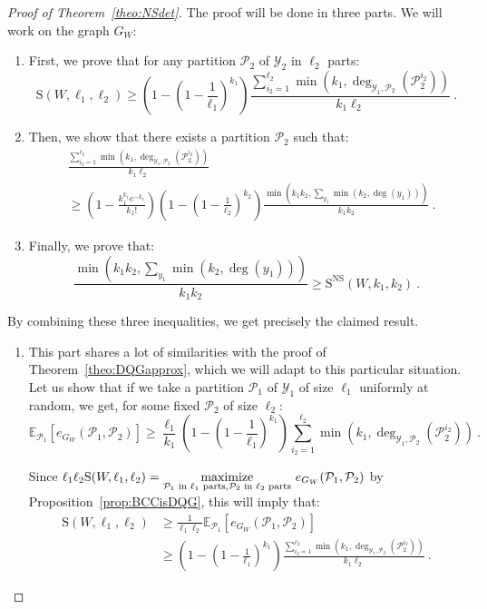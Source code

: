 \begin{proof}[Proof of Theorem~\ref{theo:NSdet}]
  The proof will be done in three parts. We will work on the graph $G_W$:
  \begin{enumerate}
  \item First, we prove that for any partition $\mathcal{P}_2$ of $\mathcal{Y}_2$ in $\ell_2$ parts:
    \[ \mathrm{S}(W,\ell_1,\ell_2) \geq \left(1-\left(1-\frac{1}{\ell_1}\right)^{k_1}\right)\frac{\sum_{i_2=1}^{\ell_2}\min\left(k_1,\deg_{\mathcal{Y}_1,\mathcal{P}_2}(\mathcal{P}_2^{i_2})\right)}{k_1\ell_2} \ . \]
  \item Then, we show that there exists a partition $\mathcal{P}_2$ such that:
    \begin{equation}
      \begin{aligned}
        &\frac{\sum_{i_2=1}^{\ell_2}\min\left(k_1,\deg_{\mathcal{Y}_1,\mathcal{P}_2}(\mathcal{P}_2^{i_2})\right)}{k_1\ell_2}\\
        &\geq \left(1 - \frac{k_1^{k_1}e^{-k_1}}{k_1!}\right)\left(1-\left(1-\frac{1}{\ell_2}\right)^{k_2}\right)\frac{\min\left(k_1k_2,\sum_{y_1}\min(k_2,\deg(y_1))\right)}{k_1k_2} \ .
      \end{aligned}
    \end{equation}
  \item Finally, we prove that:
    \[ \frac{\min\left(k_1k_2,\sum_{y_1}\min(k_2,\deg(y_1))\right)}{k_1k_2} \geq \mathrm{S}^{\textrm{NS}}(W,k_1,k_2) \ . \]
  \end{enumerate}

  By combining these three inequalities, we get precisely the claimed result.
  
  \begin{enumerate}
  \item This part shares a lot of similarities with the proof of Theorem~\ref{theo:DQGapprox}, which we will adapt to this particular situation. Let us show that if we take a partition $\mathcal{P}_1$ of $\mathcal{Y}_1$ of size $\ell_1$ uniformly at random, we get, for some fixed $\mathcal{P}_2$ of size $\ell_2$:
    \[ \mathbb{E}_{\mathcal{P}_1}[e_{G_W}(\mathcal{P}_1,\mathcal{P}_2)] \geq \frac{\ell_1}{k_1}\left(1-\left(1-\frac{1}{\ell_1}\right)^{k_1}\right)\sum_{i_2=1}^{\ell_2}\min\left(k_1,\deg_{\mathcal{Y}_1,\mathcal{P}_2}(\mathcal{P}_2^{i_2})\right) \ .\]

    Since $\ell_1\ell_2 \mathrm{S}(W,\ell_1,\ell_2) = \underset{\mathcal{P}_1 \text{ in $\ell_1$ parts},\mathcal{P}_2 \text{ in $\ell_2$ parts}}{\maxi} \ e_{G_W}(\mathcal{P}_1,\mathcal{P}_2)$ by Proposition~\ref{prop:BCCisDQG}, this will imply that:
    \begin{equation}
      \begin{aligned}
        \mathrm{S}(W,\ell_1,\ell_2) &\geq \frac{1}{\ell_1\ell_2}\mathbb{E}_{\mathcal{P}_1}[e_{G_W}(\mathcal{P}_1,\mathcal{P}_2)]\\
        &\geq \left(1-\left(1-\frac{1}{\ell_1}\right)^{k_1}\right)\frac{\sum_{i_2=1}^{\ell_2}\min\left(k_1,\deg_{\mathcal{Y}_1,\mathcal{P}_2}(\mathcal{P}_2^{i_2})\right)}{k_1\ell_2} \ .
      \end{aligned}
    \end{equation}


\end{enumerate}
\end{proof}
